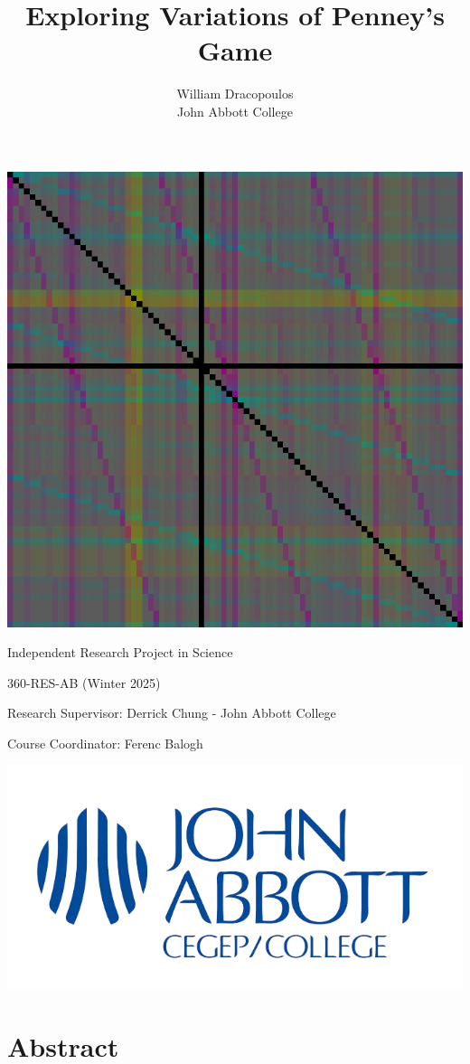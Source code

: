 \documentclass[english,12pt,a4paper,final]{article}
\title{Exploring Variations of Penney's Game}
\author{
William Dracopoulos
\\
John Abbott College
}
\begin{document}
\maketitle
	
\begin{center}

\Large

\includegraphics[width=0.7\linewidth]{"s3k4 3p"}

Independent Research Project in Science

360-RES-AB (Winter 2025)

Research Supervisor: Derrick Chung - John Abbott College

Course Coordinator: Ferenc Balogh

\begin{center}
	\includegraphics[width=0.27\linewidth]{John-Abbott}
\end{center}

\end{center}

\newpage

\tableofcontents
\newpage

\part{Abstract}
\end{document}
